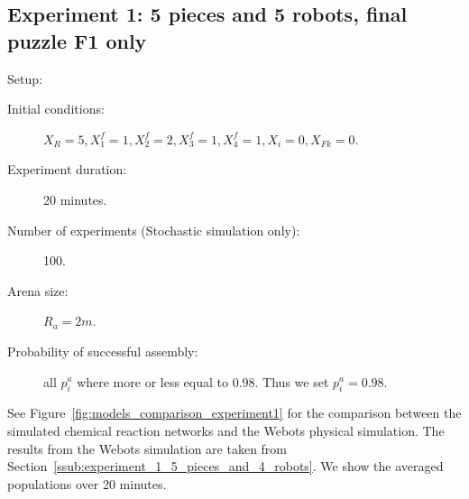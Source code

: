 	
	\subsection{Experiment 1: 5 pieces and 5 robots, final puzzle F1 only} %
	\label{sub:experiment_1_5_pieces_and_5_robots_final_puzzle_f1_only}
		Setup:
		\begin{description}
			\item[Initial conditions:] $X_R = 5, X_1^f=1, X_2^f=2, X_3^f=1, X_4^f=1, X_i=0, X_{Fk}=0$.
			\item[Experiment duration:] 20 minutes.
			\item[Number of experiments (Stochastic simulation only):] 100.
			\item[Arena size:] $R_a = 2m$.
			\item[Probability of successful assembly:] all $p^a_i$ where more or less equal to $0.98$. Thus we set $p^a_i = 0.98$.
		\end{description}
				
		See Figure~\ref{fig:models_comparison_experiment1} for the comparison between the simulated chemical reaction networks and the Webots physical simulation. The results from the Webots simulation are taken from Section~\ref{ssub:experiment_1_5_pieces_and_4_robots}. We show the averaged populations over 20 minutes.
				

